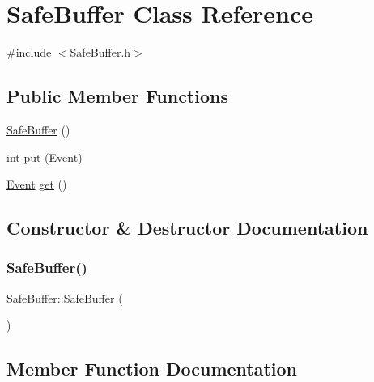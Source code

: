 \hypertarget{class_safe_buffer}{}\section{Safe\+Buffer Class Reference}
\label{class_safe_buffer}


{\ttfamily \#include $<$Safe\+Buffer.\+h$>$}

\subsection*{Public Member Functions}
\begin{DoxyCompactItemize}
\item 
\hyperlink{class_safe_buffer_af835d8d08c4dcd3326f21ae2e9988699}{Safe\+Buffer} ()
\item 
int \hyperlink{class_safe_buffer_a851df5cf7679efec7e27ec99842b7177}{put} (\hyperlink{class_event}{Event})
\item 
\hyperlink{class_event}{Event} \hyperlink{class_safe_buffer_a883f95ba075a1c0505be645c1d8ae4c0}{get} ()
\end{DoxyCompactItemize}


\subsection{Constructor \& Destructor Documentation}
\mbox{\label{class_safe_buffer_af835d8d08c4dcd3326f21ae2e9988699}} 
\subsubsection{\texorpdfstring{Safe\+Buffer()}{SafeBuffer()}}
{\footnotesize\ttfamily Safe\+Buffer\+::\+Safe\+Buffer (\begin{DoxyParamCaption}{ }\end{DoxyParamCaption})}



\subsection{Member Function Documentation}
\mbox{\label{class_safe_buffer_a883f95ba075a1c0505be645c1d8ae4c0}} 
